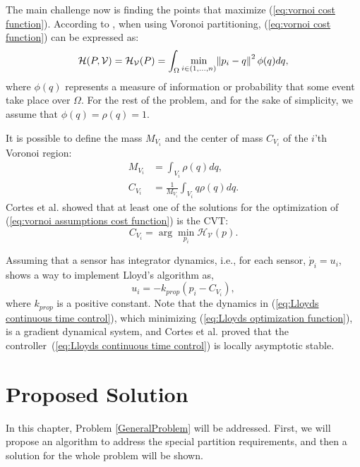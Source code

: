 \documentclass{iacas}
\begin{document}
The main challenge now is finding the points that maximize (\ref{eq:vornoi cost function}). According to \cite{Cortes2004}, when using Voronoi partitioning, (\ref{eq:vornoi cost function}) can be expressed as:
\begin{equation}
\mathcal{H}(P, \mathcal{V}) = \mathcal{H}_{\mathcal{V}}(P) = \int_{\Omega} \min_{i \in (1,\ldots, n)} \norm{p_i-q}^2 \phi(q) dq,
\label{eq:vornoi assumptions cost function}
\end{equation}
where $\phi(q)$ represents a measure of information or probability that some event take place over $\Omega$. For the rest of the problem, and for the sake of simplicity, we assume that $\phi(q) = \rho(q) = 1$.

It is possible to define the mass $M_{V_i}$ and the center of mass $C_{V_i}$ of the $i$'th Voronoi region:
\begin{align*}
M_{V_i} &= \int_{V_i} \rho(q)dq, \\
C_{V_i} &= \frac{1}{M_{V_i}} \int_{V_i} q\rho(q)dq.
\end{align*}
Cortes et al. \cite{Cortes2004} showed that at least one of the solutions for the optimization of (\ref{eq:vornoi assumptions cost function}) is the CVT:
\begin{equation}
C_{V_i} = \arg\min_{p_i} \mathcal{H}_{\mathcal{V}}(p).
\end{equation}

Assuming that a sensor has integrator dynamics, i.e., for each sensor, $\dot{p}_i = u_i$, \cite{Cortes2004} shows a way to implement Lloyd's algorithm as,
%
\begin{equation} \label{eq:Lloyds continuous time control}
u_{i} = -k_{prop}\left( p_i - C_{V_{i}} \right),
\end{equation} 
where $k_{prop}$ is a positive constant. Note that the dynamics in (\ref{eq:Lloyds continuous time control}), which minimizing (\ref{eq:Lloyds optimization function}), is a gradient dynamical system, and Cortes et al. \cite{Cortes2004} proved that the controller~(\ref{eq:Lloyds continuous time control}) is locally asymptotic stable.


\section{Proposed Solution}

In this chapter, Problem \ref{GeneralProblem} will be addressed. First, we will propose an algorithm to address the special partition requirements, and then a solution for the whole problem will be shown.
\end{document}
